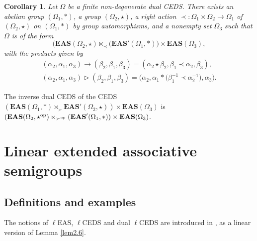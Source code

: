 \documentclass[10pt,a4paper]{amsart}
\numberwithin{equation}{section}
\newtheorem{Corollary}[Theorem]{Corollary}
\newcommand{\eas}{\mathbf{EAS}}
\begin{document}
\begin{Corollary}\label{cor3.15}
Let $\Omega$ be a finite non-degenerate dual CEDS. There exists an abelian group $(\Omega_1,*)$, a group $(\Omega_2,\star)$, a right action $\prec\colon\Omega_1\times \Omega_2\longrightarrow \Omega_1$ of $(\Omega_2,\star)$ on $(\Omega_1,*)$ by group automorphisms,
 and a nonempty set $\Omega_3$ such that $\Omega$ is of the form
\[(\eas(\Omega_2,\star) \ltimes_\prec \bigl(\eas'(\Omega_1,*)\bigr)\times \eas(\Omega_3),\]
with the products given by
\begin{gather*}
(\alpha_2,\alpha_1,\alpha_3)\rightarrow(\beta_2,\beta_1,\beta_3) =(\alpha_2\star\beta_2,\beta_1\prec\alpha_2,\beta_3),\\
(\alpha_2,\alpha_1,\alpha_3)\triangleright(\beta_2,\beta_1,\beta_3) =\bigl(\alpha_2,\alpha_1*\bigl(\beta_1^{-1}\prec \alpha_2^{-1}\bigr),\alpha_3\bigr).
\end{gather*} \end{Corollary}

\begin{Remark}
The inverse dual CEDS of the CEDS $(\eas(\Omega_1,*) \rtimes_\succ \eas'(\Omega_2,\star))\times \eas(\Omega_3)$ is $(\eas(\Omega_2,\star^{\rm op}) \ltimes_{\succ^{\rm op}} (\eas'(\Omega_1,*))\times \eas(\Omega_3)$.
\end{Remark}


\section{Linear extended associative semigroups}

\subsection{Definitions and examples}

The notions of $\ell$EAS, $\ell$CEDS and dual $\ell$CEDS are introduced in \cite[Definition 1.5]{Foissy48}, as a linear version of Lemma \ref{lem2.6}.
\end{document}

